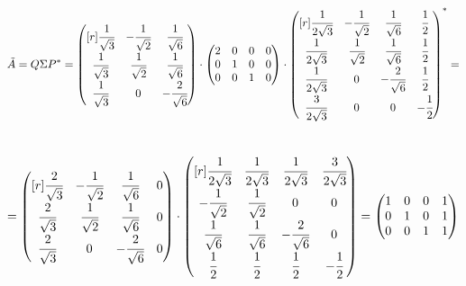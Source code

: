 \documentclass[12pt]{article}
\theoremstyle{definition}
\numberwithin{equation}{section}
\begin{document}
\[\tilde{A} = Q \Sigma P^* = \begin{pmatrix}[r]
\cfrac{1}{\sqrt{3}} & -\cfrac{1}{\sqrt{2}} & \cfrac{1}{\sqrt{6}}\\ \cfrac{1}{\sqrt{3}} & \cfrac{1}{\sqrt{2}} & \cfrac{1}{\sqrt{6}}\\ \cfrac{1}{\sqrt{3}} & 0 & -\cfrac{2}{\sqrt{6}}\\ 
\end{pmatrix} \cdot \begin{pmatrix}
2 & 0 & 0 & 0\\         
0 & 1 & 0 & 0\\
0 & 0 & 1 & 0\\
\end{pmatrix} \cdot \begin{pmatrix}[r]
\cfrac{1}{2\sqrt{3}} & -\cfrac{1}{\sqrt{2}} & \cfrac{1}{\sqrt{6}} & \cfrac{1}{2}\\ 
\cfrac{1}{2\sqrt{3}} & \cfrac{1}{\sqrt{2}} & \cfrac{1}{\sqrt{6}} & \cfrac{1}{2}\\ 
\cfrac{1}{2\sqrt{3}} & 0 & -\cfrac{2}{\sqrt{6}} & \cfrac{1}{2}\\
\cfrac{3}{2\sqrt{3}} & 0 & 0 & -\cfrac{1}{2}\\
\end{pmatrix}^*=\]\\ \[= \begin{pmatrix}[r]
\cfrac{2}{\sqrt{3}} & -\cfrac{1}{\sqrt{2}} & \cfrac{1}{\sqrt{6}} & 0\\ 
\cfrac{2}{\sqrt{3}} & \cfrac{1}{\sqrt{2}} & \cfrac{1}{\sqrt{6}} & 0\\ 
\cfrac{2}{\sqrt{3}} & 0 & -\cfrac{2}{\sqrt{6}} & 0\\
\end{pmatrix} \cdot \begin{pmatrix}[r]
\cfrac{1}{2\sqrt{3}} & \cfrac{1}{2\sqrt{3}} & \cfrac{1}{2\sqrt{3}} & \cfrac{3}{2\sqrt{3}}\\ 
-\cfrac{1}{\sqrt{2}} & \cfrac{1}{\sqrt{2}} & 0 & 0\\ 
\cfrac{1}{\sqrt{6}} & \cfrac{1}{\sqrt{6}} & -\cfrac{2}{\sqrt{6}} & 0\\
\cfrac{1}{2} & \cfrac{1}{2} & \cfrac{1}{2} & -\cfrac{1}{2}\\
\end{pmatrix} = \begin{pmatrix}
1 & 0 & 0 & 1\\         
0 & 1 & 0 & 1\\
0 & 0 & 1 & 1\\
\end{pmatrix}\]
\end{document}
